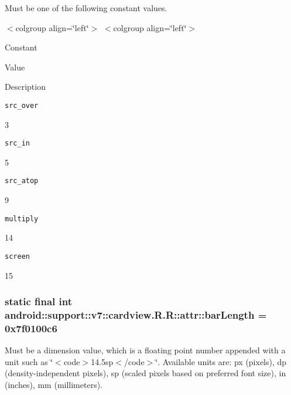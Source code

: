 Must be one of the following constant values. \begin{TabularC}{0}
\hline
\end{TabularC}
$<$colgroup align=\char`\"{}left\char`\"{}$>$ $<$colgroup align=\char`\"{}left\char`\"{}$>$ 

Constant

Value

Description 

{\tt src\_\-over}

3

{\tt src\_\-in}

5

{\tt src\_\-atop}

9

{\tt multiply}

14

{\tt screen}

15\hypertarget{classandroid_1_1support_1_1v7_1_1cardview_1_1_r_1_1attr_b37922e91c896cc408e0b46479507e6e}{
\subsubsection[{barLength}]{\setlength{\rightskip}{0pt plus 5cm}static final int android::support::v7::cardview.R.R::attr::barLength = 0x7f0100c6}}
\label{classandroid_1_1support_1_1v7_1_1cardview_1_1_r_1_1attr_b37922e91c896cc408e0b46479507e6e}


Must be a dimension value, which is a floating point number appended with a unit such as \char`\"{}$<$code$>$14.5sp$<$/code$>$\char`\"{}. Available units are: px (pixels), dp (density-independent pixels), sp (scaled pixels based on preferred font size), in (inches), mm (millimeters). 

